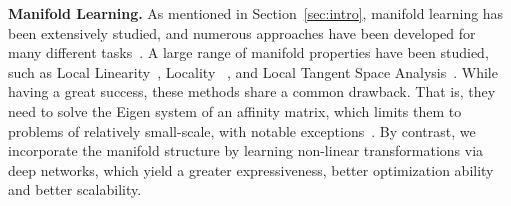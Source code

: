 \documentclass{bmvc2k}
\begin{document}
\noindent
\textbf{Manifold Learning.} 
As mentioned in Section~\ref{sec:intro}, manifold learning has been
extensively studied, and numerous approaches have been developed for many different  tasks~\cite{lle:science:00,manifold:clustering,manifold:visualizing,Belkin:semiframe:2006,dai:metric:imitation}. 
A large range of manifold properties have been
studied, such as Local Linearity~\cite{lle:science00, NPEmbedding:iccv05}, Locality ~\cite{eigenmaps:nips01}, and Local Tangent Space Analysis~\cite{ltsa}. While having a great success, these methods share a common drawback. That is, they need
to solve the Eigen system of an affinity matrix, which limits them to
problems of relatively small-scale, with notable exceptions~\cite{large:manifold}. 
By contrast, we incorporate the manifold structure by learning non-linear transformations via deep networks, which yield a greater expressiveness, better optimization ability and better scalability.
\end{document}
